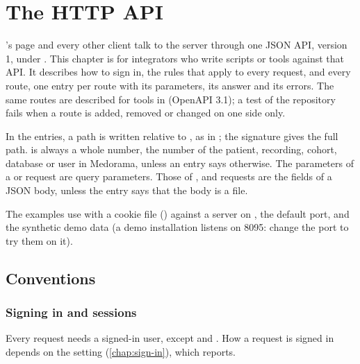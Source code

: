 \chapter{The HTTP API}
\label{chap:http-api}

\md{}'s page and every other client talk to the server through one JSON API, version 1, under
. This chapter is for integrators who write scripts or tools against that API. It
describes how to sign in, the rules that apply to every request, and every route, one entry per
route with its parameters, its answer and its errors. The same routes are described for tools in
 (OpenAPI 3.1); a test of the repository fails when a route is added,
removed or changed on one side only.

In the entries, a path is written relative to , as in ;
the signature gives the full path.  is always a whole number, the number of the
patient, recording, cohort, database or user in Medorama, unless an entry says otherwise.
The parameters of a  or  request are query parameters. Those of
,  and  requests are the fields of a JSON body, unless the entry
says that the body is a file.

The examples use  with a cookie file () against a server on
, the default port, and the synthetic demo data (a demo installation
listens on 8095: change the port to try them on it).

\section{Conventions}
\label{sec:http-api-conventions}

\subsection{Signing in and sessions}
\label{sec:http-api-signin}

Every request needs a signed-in user, except  and . How a
request is signed in depends on the setting  (\cref{chap:sign-in}), which
 reports.

